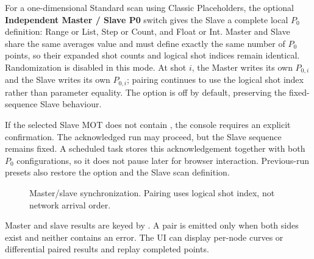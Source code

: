\documentclass[11pt,oneside,openany]{book}
\newcommand{\code}[1]{\texttt{\detokenize{#1}}}
\newcommand{\ui}[1]{\textbf{#1}}
\begin{document}
For a one-dimensional Standard scan using Classic Placeholders, the optional
\ui{Independent Master / Slave P0} switch gives the Slave a complete local $P_0$
definition: Range or List, Step or Count, and Float or Int. Master and Slave share the
same averages value and must define exactly the same number of $P_0$ points, so their
expanded shot counts and logical shot indices remain identical. Randomization is disabled
in this mode. At shot $i$, the Master writes its own $P_{0,i}$ and the Slave writes its
own $P_{0,i}$; pairing continues to use the logical shot index rather than parameter
equality. The option is off by default, preserving the fixed-sequence Slave behaviour.

If the selected Slave MOT does not contain \code{<PARAMETER0>}, the console requires an
explicit confirmation. The acknowledged run may proceed, but the Slave sequence remains
fixed. A scheduled task stores this acknowledgement together with both $P_0$
configurations, so it does not pause later for browser interaction. Previous-run presets
also restore the option and the Slave scan definition.

\begin{figure}[htbp]
\centering
{}
\caption{Master/slave synchronization. Pairing uses logical shot index, not network
arrival order.}
\label{fig:sync-timeline}
\end{figure}

Master and slave results are keyed by \code{sync_shot_index}. A pair is emitted only when
both sides exist and neither contains an error. The UI can display per-node curves or
differential paired results and replay completed points.
\end{document}
